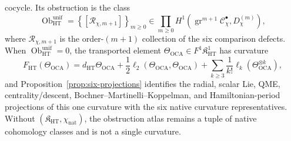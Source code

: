 \begin{defn}
\begin{enumerate}[label=\textup{(D\arabic*)}]
    cocycle.  Its obstruction is the class
    \[
      \operatorname{Ob}^{\mathrm{unif}}_{\mathrm{HT}}
      =
      \left\{[\mathcal R_{\chi,m+1}]\right\}_{m\ge0}
      \in
      \prod_{m\ge0}
      H^1\!\left(
        \operatorname{gr}^{m+1}\mathcal C^\bullet_\chi,
        D^{(m)}_\chi\right),
    \]
    where \(\mathcal R_{\chi,m+1}\) is the order-\((m+1)\) collection
    of the six comparison defects.  When
    \(\operatorname{Ob}^{\mathrm{unif}}_{\mathrm{HT}}=0\), the transported
    element \(\Theta_{\mathrm{OCA}}\in F^1\mathfrak K_{\mathrm{HT}}^1\)
    has curvature
    \[
      F_{\mathrm{HT}}(\Theta_{\mathrm{OCA}})
      =
      d_{\mathrm{HT}}\Theta_{\mathrm{OCA}}
      +\frac12\ell_2(\Theta_{\mathrm{OCA}},\Theta_{\mathrm{OCA}})
      +\sum_{k\ge3}\frac1{k!}
       \ell_k(\Theta_{\mathrm{OCA}}^{\otimes k}),
    \]
    and Proposition~\ref{prop:six-projections} identifies the radial,
    scalar Lie, QME, centrality/descent, Bochner--Martinelli--Koppelman,
    and Hamiltonian-period projections of this one curvature with the six
    native curvature representatives.  Without
    \((\mathfrak K_{\mathrm{HT}},\chi_{\mathrm{nat}})\), the obstruction
    atlas remains a tuple of native cohomology classes and is not a single
    curvature.


\end{enumerate}
\end{defn}
